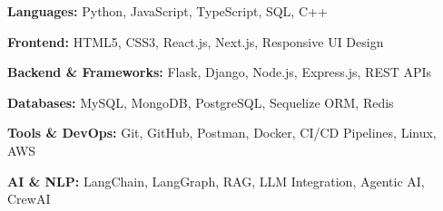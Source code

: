 \begin{itemize}[leftmargin=0.15in, label={}, itemsep=2pt, topsep=1pt]
  \small{
    \item \textbf{Languages:} Python, JavaScript, TypeScript, SQL, C++
    \item \textbf{Frontend:} HTML5, CSS3, React.js, Next.js, Responsive UI Design
    \item \textbf{Backend \& Frameworks:} Flask, Django, Node.js, Express.js, REST APIs
    \item \textbf{Databases:} MySQL, MongoDB, PostgreSQL, Sequelize ORM, Redis
    \item \textbf{Tools \& DevOps:} Git, GitHub, Postman, Docker, CI/CD Pipelines, Linux, AWS
    \item \textbf{AI \& NLP:} LangChain, LangGraph, RAG, LLM Integration, Agentic AI, CrewAI
  }
\end{itemize}